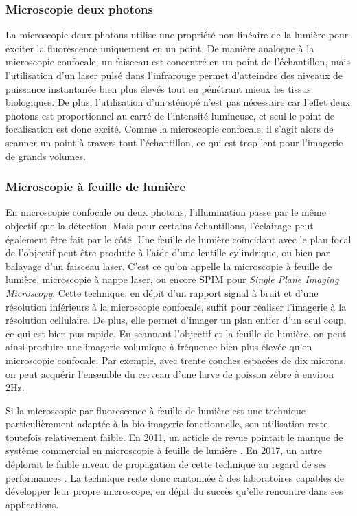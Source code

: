 \subsubsection{Microscopie deux photons}

La microscopie deux photons utilise une propriété non linéaire de la lumière pour exciter la fluorescence uniquement en un point. De manière analogue à la microscopie confocale, un faisceau est concentré en un point de l'échantillon, mais l'utilisation d'un laser pulsé dans l'infrarouge permet d'atteindre des niveaux de puissance instantanée bien plus élevés tout en pénétrant mieux les tissus biologiques. De plus, l'utilisation d'un sténopé n'est pas nécessaire car l'effet deux photons est proportionnel au carré de l'intensité lumineuse, et seul le point de focalisation est donc excité. Comme la microscopie confocale, il s'agit alors de scanner un point à travers tout l'échantillon, ce qui est trop lent pour l'imagerie de grands volumes.  

\subsubsection{Microscopie à feuille de lumière}

En microscopie confocale ou deux photons, l'illumination passe par le même objectif que la détection. Mais pour certains échantillons, l'éclairage peut également être fait par le côté. Une feuille de lumière coïncidant avec le plan focal de l'objectif peut être produite à l'aide d'une lentille cylindrique, ou bien par balayage d'un faisceau laser. C'est ce qu'on appelle la microscopie à feuille de lumière, microscopie à nappe laser, ou encore SPIM pour \emph{Single Plane Imaging Microscopy}. Cette technique, en dépit d'un rapport signal à bruit et d'une résolution inférieurs à la microscopie confocale, suffit pour réaliser l'imagerie à la résolution cellulaire. De plus, elle permet d'imager un plan entier d'un seul coup, ce qui est bien pus rapide. En scannant l'objectif et la feuille de lumière, on peut ainsi produire une imagerie volumique à fréquence bien plus élevée qu'en microscopie confocale. Par exemple, avec trente couches espacées de dix microns, on peut acquérir l'ensemble du cerveau d'une larve de poisson zèbre à environ 2Hz.

Si la microscopie par fluorescence à feuille de lumière est une technique particulièrement adaptée à la bio-imagerie fonctionnelle, son utilisation reste toutefois relativement faible. En 2011, un article de revue pointait le manque de système commercial en microscopie à feuille de lumière \cite{santi_light_2011}. En 2017, un autre déplorait le faible niveau de propagation de cette technique au regard de ses performances \cite{power_guide_2017}. La technique reste donc cantonnée à des laboratoires capables de développer leur propre microscope, en dépit du succès qu'elle rencontre dans ses applications.



